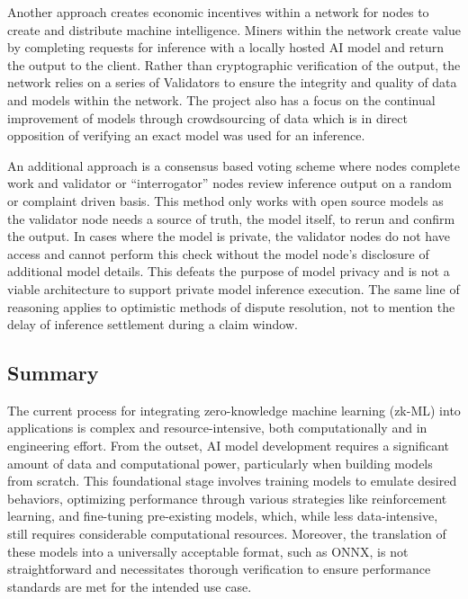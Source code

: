 \documentclass[conference]{IEEEtran}
\begin{document}
Another approach creates economic incentives within a network for nodes to create and distribute machine intelligence. Miners within the network create value by completing requests for inference with a locally hosted AI model and return the output to the client. Rather than cryptographic verification of the output, the network relies on a series of Validators to ensure the integrity and quality of data and models within the network. The project also has a focus on the continual improvement of models through crowdsourcing of data which is in direct opposition of verifying an exact model was used for an inference.

An additional approach is a consensus based voting scheme where nodes complete work and validator or “interrogator” nodes review inference output on a random or complaint driven basis. This method only works with open source models as the validator node needs a source of truth, the model itself, to rerun and confirm the output. In cases where the model is private, the validator nodes do not have access and cannot perform this check without the model node’s disclosure of additional model details. This defeats the purpose of model privacy and is not a viable architecture to support private model inference execution. The same line of reasoning applies to optimistic methods of dispute resolution, not to mention the delay of inference settlement during a claim window.

\subsection{Summary}
The current process for integrating zero-knowledge machine learning (zk-ML) into applications is complex and resource-intensive, both computationally and in engineering effort. From the outset, AI model development requires a significant amount of data and computational power, particularly when building models from scratch. This foundational stage involves training models to emulate desired behaviors, optimizing performance through various strategies like reinforcement learning, and fine-tuning pre-existing models, which, while less data-intensive, still requires considerable computational resources. Moreover, the translation of these models into a universally acceptable format, such as ONNX, is not straightforward and necessitates thorough verification to ensure performance standards are met for the intended use case.
\end{document}
